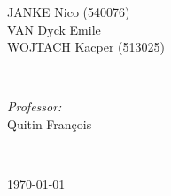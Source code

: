 \documentclass[a4paper, twoside, 12pt]{article}
\begin{document}
\begin{titlepage}
\begin{minipage}{0.4\textwidth}
\begin{flushleft}
			JANKE Nico (540076) \\ VAN Dyck Emile\\ WOJTACH Kacper (513025)
		\end{flushleft}
	\end{minipage}
	~
	\begin{minipage}{0.4\textwidth}
		\begin{flushright} \large
			\emph{Professor:} \\
			Quitin François
		\end{flushright}
	\end{minipage}\\[2cm]
	\makeatother



	{\large \today}\\[2cm] %


\end{titlepage}
\end{document}
